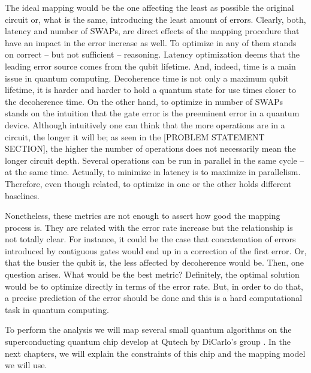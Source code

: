 The ideal mapping would be the one affecting the least as possible the original circuit or, what is the same, introducing the least amount of errors.
Clearly, both, latency and number of SWAPs, are direct effects of the mapping procedure that have an impact in the error increase as well.
To optimize in any of them stands on correct -- but not sufficient -- reasoning.
Latency optimization deems that the leading error source comes from the qubit lifetime.
And, indeed, time is a main issue in quantum computing.
Decoherence time is not only a maximum qubit lifetime, it is harder and harder to hold a quantum state for use times closer to the decoherence time.
On the other hand, to optimize in number of SWAPs stands on the intuition that the gate error is the preeminent error in a quantum device.
Although intuitively one can think that the more operations are in a circuit, the longer it will be; as seen in the [PROBLEM STATEMENT SECTION], the higher the number of operations does not necessarily mean the longer circuit depth.
Several operations can be run in parallel in the same cycle -- at the same time.
Actually, to minimize in latency is to maximize in parallelism.
Therefore, even though related, to optimize in one or the other holds different baselines.

Nonetheless, these metrics are not enough to assert how good the mapping process is.
They are related with the error rate increase but the relationship is not totally clear.
For instance, it could be the case that concatenation of errors introduced by contiguous gates would end up in a correction of the first error.
Or, that the busier the qubit is, the less affected by decoherence would be.
Then, one question arises.
What would be the best metric?
Definitely, the optimal solution would be to optimize directly in terms of the error rate.
But, in order to do that, a precise prediction of the error should be done and this is a hard computational task in quantum computing.

To perform the analysis we will map several small quantum algorithms on the superconducting quantum chip develop at Qutech by DiCarlo's group \cite{Versluis_2017}.
In the next chapters, we will explain the constraints of this chip and the mapping model we will use.
